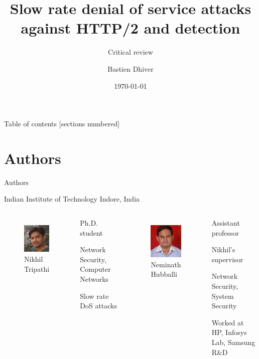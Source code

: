 \documentclass{beamer}
\title{Slow rate denial of service attacks against HTTP/2 and detection}
\subtitle{Critical review}
\date{\today}
\author{Bastien Dhiver}
\institute{\href{mailto:bfrd2@kent.ac.uk}{bfrd2@kent.ac.uk}}
\begin{document}
\maketitle

\begin{frame}{Table of contents}
	[sections numbered]
	\tableofcontents[hideallsubsections]
\end{frame}

\section{Authors}

\begin{frame}{Authors}

Indian Institute of Technology Indore, India

  \begin{columns}[T,onlytextwidth]
	\begin{figure}[t]
    \includegraphics[width=2cm]{images/Nikhil.jpg}
    \\ Nikhil Tripathi
\centering
	\end{figure}

      \begin{itemize}
	{\small
	\item Ph.D. student
	\item Network Security, Computer Networks
	\item Slow rate DoS attacks
	}
      \end{itemize}


	\begin{figure}[t]
    \includegraphics[width=2cm]{images/neminath.jpg}
    \\ Neminath Hubballi
\centering
	\end{figure}

      \begin{itemize}
	{\small
	\item Assistant professor
	\item Nikhil's supervisor
	\item Network Security, System Security
	\item Worked at HP, Infosys Lab, Samsung R\&D
	}
      \end{itemize}

  \end{columns}
\end{frame}
\end{document}
